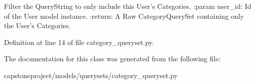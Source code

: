 \begin{DoxyVerb}Filter the QueryString to only include this User's Categories.
:param user_id: Id of the User model instance.
:return: A Raw CategoryQuerySet containing only the User's Categories.
\end{DoxyVerb}
 

Definition at line 14 of file category\+\_\+queryset.\+py.



The documentation for this class was generated from the following file\+:\begin{DoxyCompactItemize}
\item 
capstoneproject/models/querysets/category\+\_\+queryset.\+py\end{DoxyCompactItemize}
